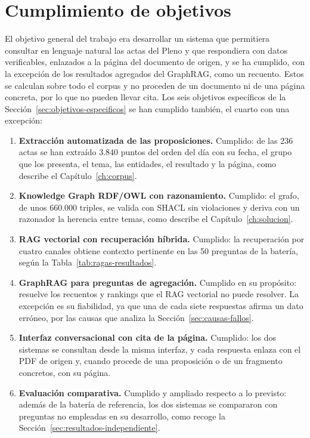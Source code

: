\documentclass[11pt, a4paper]{report}
\begin{document}
	\section{Cumplimiento de objetivos}

	El objetivo general del trabajo era desarrollar un sistema que permitiera
	consultar en lenguaje natural las actas del Pleno y que respondiera con datos
	verificables, enlazados a la página del documento de origen, y se
	ha cumplido, con la excepción de los resultados agregados del GraphRAG, como
	un recuento. Estos se calculan sobre todo el corpus y no proceden de un
	documento ni de una página concreta, por lo que no pueden llevar cita. Los seis objetivos específicos de la
	Sección~\ref{sec:objetivos-especificos} se han cumplido también, el cuarto con una excepción:

	\begin{enumerate}
		\item \textbf{Extracción automatizada de las proposiciones.} Cumplido: de
		las 236 actas se han extraído 3.840 puntos del orden del día con su
		fecha, el grupo que los presenta, el tema, las entidades, el resultado y
		la página, como describe el Capítulo~\ref{ch:corpus}.
		\item \textbf{Knowledge Graph RDF/OWL con razonamiento.} Cumplido:
		el grafo, de unos 660.000 triples, se valida con SHACL sin violaciones y
		deriva con un razonador la herencia entre temas, como describe el
		Capítulo~\ref{ch:solucion}.
		\item \textbf{RAG vectorial con recuperación híbrida.} Cumplido: la
		recuperación por cuatro canales obtiene contexto pertinente en las 50
		preguntas de la batería, según la Tabla~\ref{tab:ragas-resultados}.
		\item \textbf{GraphRAG para preguntas de agregación.} Cumplido en su
		propósito: resuelve los recuentos y rankings que el RAG vectorial no puede
		resolver. La excepción es su fiabilidad, ya que una de cada siete
		respuestas afirma un dato erróneo, por las causas que analiza la
		Sección~\ref{sec:causas-fallos}.
		\item \textbf{Interfaz conversacional con cita de la página.} Cumplido:
		los dos sistemas se consultan desde la misma interfaz, y cada respuesta
		enlaza con el PDF de origen y, cuando procede de una proposición o de un
		fragmento concretos, con su página.
		\item \textbf{Evaluación comparativa.} Cumplido y ampliado respecto a lo
		previsto: además de la batería de referencia, los dos sistemas se
		compararon con preguntas no empleadas en su desarrollo, como recoge la
		Sección~\ref{sec:resultados-independiente}.
	\end{enumerate}
\end{document}
